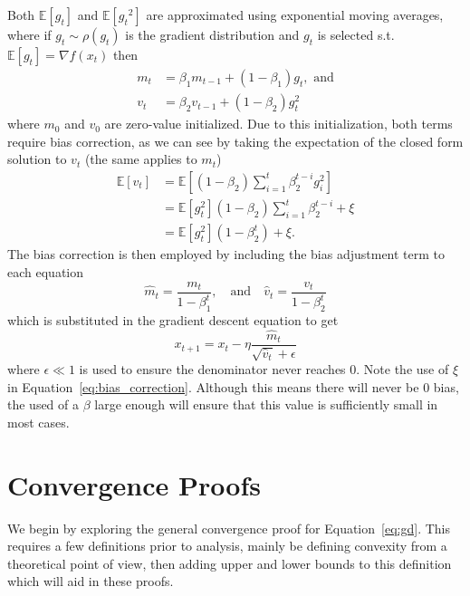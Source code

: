 \documentclass{article}
\newcommand{\E}{\mathbb E}
\theoremstyle{definition}
\begin{document}
Both $\E \left[ g_t \right]$ and $\E \left[ {g_t}^2
\right]$ are approximated using exponential moving averages, where if $g_t \sim
\rho(g_t)$ is the gradient distribution and $g_t$ is selected s.t. $\E[g_t] =
\nabla f(x_t)$ then
\begin{equation}
    \begin{aligned}
        m_t &= \beta_1 m_{t-1} + (1 - \beta_1)g_{t}, \text{ and} \\
        v_t &= \beta_2 v_{t-1} + (1 - \beta_2)g_{t}^2
    \end{aligned}
\end{equation}
where $m_0$ and $v_0$ are zero-value initialized. Due to this initialization,
both terms require bias correction, as we can see by taking the expectation of
the closed form solution to $v_t$ (the same applies to $m_t$)
\begin{equation}
    \label{eq:bias_correction}
    \begin{aligned}
        \E \left[ v_t \right] &= \E \left[ (1 - \beta_2) \sum_{i = 1}^t
        \beta_2^{t - i} g_i^2 \right] \\
         &= \E \left[g_t^2 \right](1 - \beta_2) \sum_{i = 1}^t
        \beta_2^{t - i} + \xi \\
         &= \E \left[g_t^2 \right](1 - \beta_2^t) + \xi.
    \end{aligned}
\end{equation}
The bias correction is then employed by including the bias adjustment term to
each equation
\begin{equation}
    \hat m_t = \frac{m_t}{1 - \beta_1^t}, \quad \text{and} \quad
    \hat v_t = \frac{v_t}{1 - \beta_2^t}
\end{equation}
which is substituted in the gradient descent equation to get 
\begin{equation}
    x_{t + 1} = x_t - \eta \frac{\hat m_t}{\sqrt{\hat v_t} + \epsilon}
\end{equation}
where $\epsilon \ll 1$ is used to ensure the denominator never reaches 0. Note
the use of $\xi$ in Equation~\ref{eq:bias_correction}. Although this means there
will never be 0 bias, the used of a $\beta$ large enough will ensure that this
value is sufficiently small in most cases.

\section{Convergence Proofs}


We begin by exploring the general convergence proof for Equation~\ref{eq:gd}.
This requires a few definitions prior to analysis, mainly be defining convexity
from a theoretical point of view, then adding upper and lower bounds to this
definition which will aid in these proofs. 
\end{document}
